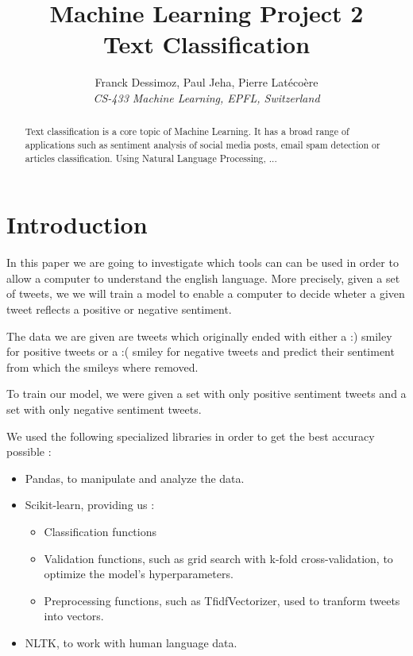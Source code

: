 \documentclass[10pt,conference,compsocconf]{IEEEtran}
\begin{document}
\title{Machine Learning Project 2\\Text Classification}

\author{
  Franck Dessimoz, Paul Jeha, Pierre Lat\'{e}co\`{e}re\\
  \textit{CS-433 Machine Learning, EPFL, Switzerland}
}

\maketitle

\begin{abstract}
Text classification is a core topic of Machine Learning. It has a broad range of applications such as sentiment analysis of social media posts, email spam detection or articles classification.
Using Natural Language Processing, ...
\end{abstract}

\section{Introduction}
In this paper we are going to investigate which tools can can be used in order to allow a computer to understand the english language. More precisely, given a set of tweets, we we will train a model to enable a computer to decide wheter a given tweet reflects a positive or negative sentiment.

The data we are given are tweets which originally ended with either a :) smiley for positive tweets or a :( smiley for negative tweets and predict their sentiment from which the smileys where removed.

To train our model, we were given a set with only positive sentiment tweets and a set with only negative sentiment tweets.

We used the following specialized libraries in order to get the best accuracy possible :
\begin{itemize}
\item Pandas, to manipulate and analyze the data.
\item Scikit-learn, providing us :
\begin{itemize}
  \item Classification functions
  \item Validation functions, such as grid search with k-fold cross-validation, to optimize the model's hyperparameters.
  \item Preprocessing functions, such as TfidfVectorizer, used to tranform tweets into vectors. 
\end{itemize}
\item NLTK, to work with human language data.
\end{itemize}
\end{document}
